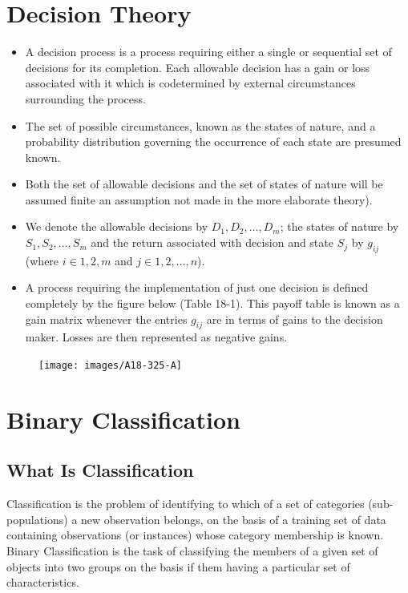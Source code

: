 \documentclass[]{report}
\begin{document}
\section*{Decision Theory }
\begin{itemize}
    \item A decision process is a process requiring either a single or sequential set of decisions for its completion. Each allowable decision has a gain or loss associated with it which is codetermined by external circumstances surrounding the process. 
    \item The set of possible circumstances, known as the states of nature, and a probability distribution governing the occurrence of each state are presumed known.
    \item Both the set of allowable decisions and the set of states of nature will be assumed finite an assumption not made in the more elaborate theory). 
    \item We denote the allowable decisions by $D_1, D_2, \ldots ,D_m$; the states of nature by $S_1, S_2, \ldots ,S_m$ and the return associated with decision and state $S_j$ by $g_{ij}$ (where $ i \in 1,2,m$ and $j \in 1,2,\ldots,n$). 
    \item A process requiring the implementation of just one decision is defined completely by the figure below (Table 18-1). This payoff table is known as a gain matrix whenever the entries $g_{ij}$ are in terms of gains to the decision maker. Losses are then represented as negative gains. 
\end{itemize} 
	\begin{figure}[h!]
\centering
\texttt{[image: images/A18-325-A]}
\end{figure}

\section*{Binary Classification}
\subsection*{What Is Classification}
Classification is the problem of identifying to which of a set of categories
(sub-populations) a new observation belongs, on the basis of a training set
of data containing observations (or instances) whose category membership is
known. Binary Classification is the task of classifying the members of a given set of objects into two groups on the basis
if them having a particular set of characteristics.
\end{document}
